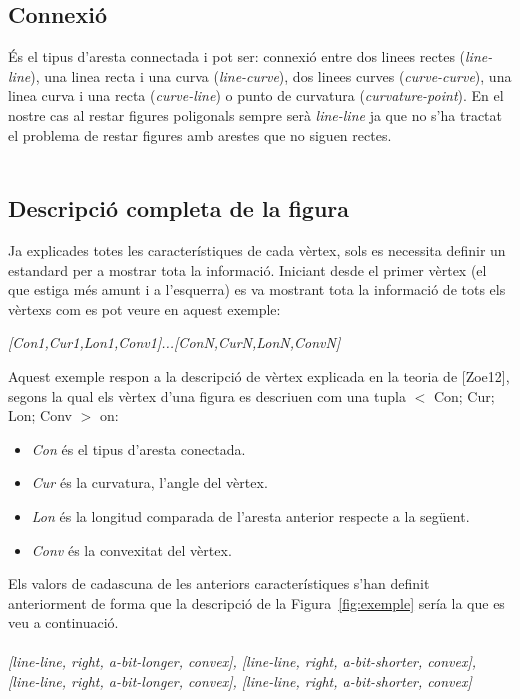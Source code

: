 \documentclass{article}
\begin{document}
\subsection{Connexió}
És el tipus d'aresta connectada i pot ser: connexió entre dos linees rectes (\emph{line-line}), una linea recta i una curva (\emph{line-curve}), dos linees curves (\emph{curve-curve}), una linea curva i una recta (\emph{curve-line}) o punto de curvatura (\emph{curvature-point}).
En el nostre cas al restar figures poligonals sempre serà \emph{line-line} ja que no s'ha tractat el problema de restar figures amb arestes que no siguen rectes.
\\
\\
\subsection{Descripció completa de la figura}
Ja explicades totes les característiques de cada vèrtex, sols es necessita definir un estandard per a mostrar tota la informació.
Iniciant desde el primer vèrtex (el que estiga més amunt i a l'esquerra) es va mostrant tota la informació de tots els vèrtexs com es pot veure en aquest exemple:
  
\begin{center}
\emph{[Con1,Cur1,Lon1,Conv1]...[ConN,CurN,LonN,ConvN]}
\end{center}

Aquest exemple respon a la descripció de vèrtex explicada en la teoria de [Zoe12], segons la qual els vèrtex d'una figura es descriuen com una tupla $<$ Con; Cur; Lon; Conv $>$ on:

\begin{itemize}
\item \emph{Con} és el tipus d'aresta conectada.
\item \emph{Cur} és la curvatura, l'angle del vèrtex.
\item \emph{Lon} és la longitud comparada de l'aresta anterior respecte a la següent.
\item \emph{Conv} és la convexitat del vèrtex.
\end{itemize}

Els valors de cadascuna de les anteriors característiques s'han definit anteriorment de forma que la descripció de la Figura~\ref{fig:exemple} sería la que es veu a continuació.
\\
\\
\emph{[line-line, right, a-bit-longer, convex], [line-line, right, a-bit-shorter, convex], [line-line, right, a-bit-longer, convex], [line-line, right, a-bit-shorter, convex]}
\end{document}
